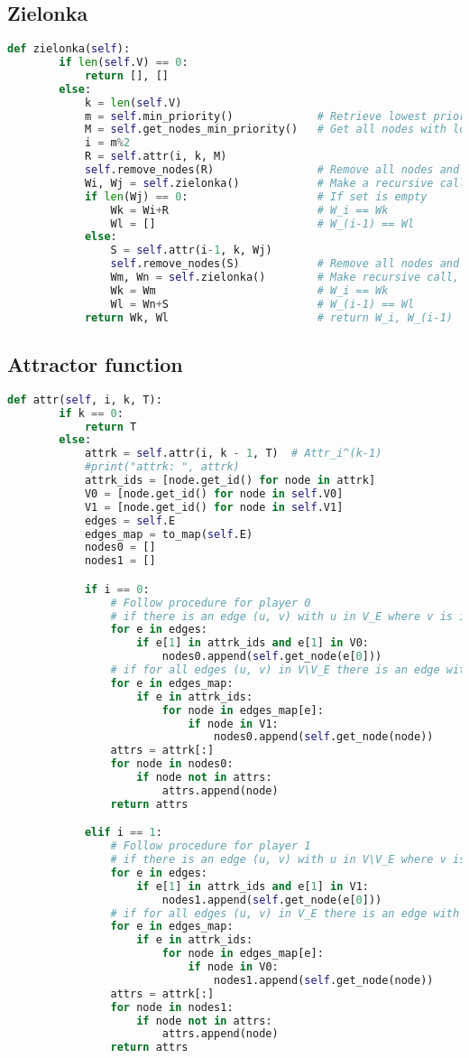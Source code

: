 \documentclass[12pt]{article}
\begin{document}
\subsection{Zielonka}
\begin{lstlisting}[language=python]
    def zielonka(self):
		if len(self.V) == 0:
			return [], []
		else:
			k = len(self.V)
			m = self.min_priority()             # Retrieve lowest priority
			M = self.get_nodes_min_priority()   # Get all nodes with lowest priority
			i = m%2
			R = self.attr(i, k, M)
			self.remove_nodes(R)                # Remove all nodes and related edges from the game
			Wi, Wj = self.zielonka()            # Make a recursive call, W_i' == Wi, W_(i-1)' == Wj
			if len(Wj) == 0:                    # If set is empty
				Wk = Wi+R                       # W_i == Wk
				Wl = []                         # W_(i-1) == Wl
			else:
				S = self.attr(i-1, k, Wj)
				self.remove_nodes(S)            # Remove all nodes and related edges from the game
				Wm, Wn = self.zielonka()        # Make recursive call, W_i'' == Wm, W_(i-1)'' == Wn
				Wk = Wm                         # W_i == Wk
				Wl = Wn+S                       # W_(i-1) == Wl
			return Wk, Wl                       # return W_i, W_(i-1)
\end{lstlisting}

\subsection{Attractor function}
\label{attractor}
\begin{lstlisting}[language=python]
    def attr(self, i, k, T):
		if k == 0:
			return T
		else:
			attrk = self.attr(i, k - 1, T)  # Attr_i^(k-1)
			#print("attrk: ", attrk)
			attrk_ids = [node.get_id() for node in attrk]
			V0 = [node.get_id() for node in self.V0]
			V1 = [node.get_id() for node in self.V1]
			edges = self.E
			edges_map = to_map(self.E)
			nodes0 = []
			nodes1 = []

			if i == 0:
				# Follow procedure for player 0
				# if there is an edge (u, v) with u in V_E where v is in attrk, add u to the list
				for e in edges:
					if e[1] in attrk_ids and e[1] in V0:
						nodes0.append(self.get_node(e[0]))
				# if for all edges (u, v) in V\V_E there is an edge with v in attrk, add u to the list
				for e in edges_map:
					if e in attrk_ids:
						for node in edges_map[e]:
							if node in V1:
								nodes0.append(self.get_node(node))
				attrs = attrk[:]
				for node in nodes0:
					if node not in attrs:
						attrs.append(node)
				return attrs

			elif i == 1:
				# Follow procedure for player 1
				# if there is an edge (u, v) with u in V\V_E where v is in attrk, add u to the list
				for e in edges:
					if e[1] in attrk_ids and e[1] in V1:
						nodes1.append(self.get_node(e[0]))
				# if for all edges (u, v) in V_E there is an edge with v in attrk, add u to the list
				for e in edges_map:
					if e in attrk_ids:
						for node in edges_map[e]:
							if node in V0:
								nodes1.append(self.get_node(node))
				attrs = attrk[:]
				for node in nodes1:
					if node not in attrs:
						attrs.append(node)
				return attrs
\end{lstlisting}
\end{document}
